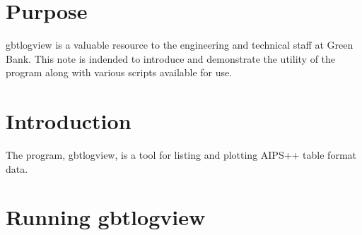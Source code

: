 \def\eps@scaling{.95}
\def\epsscale#1{\gdef\eps@scaling{#1}}
\def\plotfiddle#1#2#3#4#5#6#7{\centering \leavevmode
    \vbox to#2{\rule{0pt}{#2}}
    \special{psfile=#1 voffset=#7 hoffset=#6 vscale=#5 hscale=#4 angle=#3}}

%
%
%
\newcommand{\thisdocURL}{http://aips2.nrao.edu/aips++/docs/notes/202/202.html}
\newcommand{\searchURL}{../../html/aips2search.html}
\newcommand{\aipsviewURL}{../../user/aipsview/aipsview.html}
\newcommand{\GlishmanualURL}{../../reference/Glish/Glish.html}
\newcommand{\GlishtutorialURL}{../../notes/195/195.html}
\newcommand{\synthesisURL}{../../user/synthesis/synthesis.html}
\newcommand{\gsURL}{../../user/gettingstarted/gettingstarted.html}
\newcommand{\userrefmanualURL}{../../user/Refman/Refman.html}
\newcommand{\specsURL}{../../specs/specs.html}
\newcommand{\betaURL}{../beta/beta.html}
\newcommand{\consortiumURL}{../consortium.html}
\newcommand{\gbthomelink}{http://www.gb.nrao.edu/GBT/GBT.html}
\newcommand{\vlahomelink}{http://www.nrao.edu/doc/vla/html/VLAhome.shtml}
\newcommand{\cvhomelink}{http://www.cv.nrao.edu/cv-home.html}

%
%

%


\section{Purpose}
gbtlogview is a valuable resource to the engineering and technical staff at
Green Bank. This note is indended to introduce and demonstrate the utility
of the program along with various scripts available for use.
\bigskip
\section{Introduction}
The program, gbtlogview, is a tool for listing and plotting AIPS++ table
format data. 

\section{Running gbtlogview}

